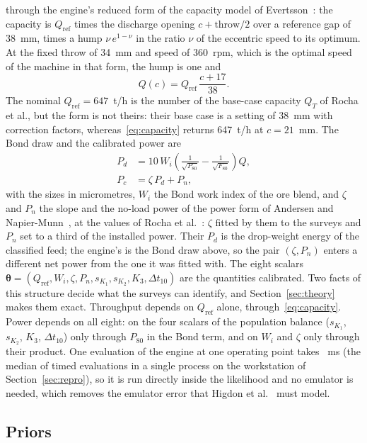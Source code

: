 \documentclass[journal]{IEEEtran}
\begin{document}
through the engine's reduced form of the capacity model of Evertsson~\cite{evertsson}: the capacity is $Q_{\mathrm{ref}}$
times the discharge opening $c+\text{throw}/2$ over a reference gap of 38~mm, times a hump $\nu\,e^{1-\nu}$ in the ratio $\nu$ of
the eccentric speed to its optimum. At the fixed throw of 34~mm and speed of 360~rpm, which is the optimal speed of the
machine in that form, the hump is one and
\begin{equation}
Q(c)=Q_{\mathrm{ref}}\,\frac{c+17}{38}.
\label{eq:capacity}
\end{equation}
The nominal $Q_{\mathrm{ref}}=647$~t/h is the number of the base-case capacity $Q_T$ of Rocha et al., but the form is not
theirs: their base case is a setting of 38~mm with correction factors, whereas~\eqref{eq:capacity} returns 647~t/h at
$c=21$~mm.
The Bond draw and the calibrated power are
\begin{align}
P_d &= 10\,W_i\left(\frac{1}{\sqrt{P_{80}}}-\frac{1}{\sqrt{F_{80}}}\right) Q,\nonumber\\
P_c &= \zeta\,P_d+P_n,
\label{eq:power}
\end{align}
with the sizes in micrometres, $W_i$ the Bond work index of the ore blend, and $\zeta$ and $P_n$ the slope and the no-load
power of the power form of Andersen and Napier-Munn~\cite{andersen}, at the values of Rocha et al.~\cite{rocha}: $\zeta$
fitted by them to the surveys and $P_n$ set to a third of the installed power. Their $P_d$ is the drop-weight energy of the classified feed; the engine's is the Bond draw above, so the pair
$(\zeta,P_n)$ enters a different net power from the one it was fitted with. The eight scalars
$\boldsymbol\theta=(Q_{\mathrm{ref}},W_i,\zeta,P_n,s_{K_1},s_{K_2},K_3,\Delta t_{10})$ are the quantities calibrated. Two
facts of this structure decide what the surveys can identify, and Section~\ref{sec:theory} makes them exact. Throughput
depends on $Q_{\mathrm{ref}}$ alone, through~\eqref{eq:capacity}. Power depends on all eight: on the four scalars of the
population balance ($s_{K_1}$, $s_{K_2}$, $K_3$, $\Delta t_{10}$) only through $P_{80}$ in the Bond term, and on $W_i$ and
$\zeta$ only through their product. One evaluation of the engine at one operating point takes \engineMs~ms (the median of
\engineMsEvals{} timed evaluations in a single process on the workstation of Section~\ref{sec:repro}), so it is run
directly inside the likelihood and no emulator is needed, which removes the emulator error that Higdon et
al.~\cite{higdon} must model.

\subsection{Priors}
\end{document}
